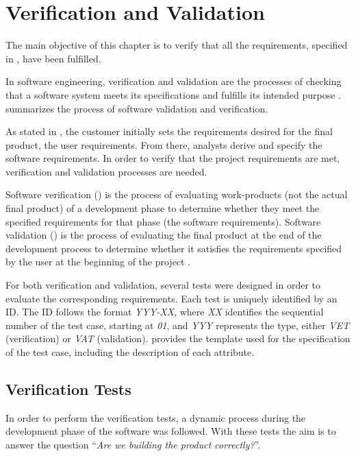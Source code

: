 \chapter{Verification and Validation}\label{chap:validation}
The main objective of this chapter is to verify that all the requirements, specified in , have been fulfilled.

In \gls{software engineering}, verification and validation are the processes of checking that a software system meets its specifications and fulfills its intended purpose \parencite{IEEE1012-2012}.  summarizes the process of software validation and verification.


As stated in , the customer initially sets the requirements desired for the final product, the user requirements. From there, analysts derive and specify the software requirements. In order to verify that the project requirements are met, verification and validation processes are needed.

Software verification () is the process of evaluating work-products (not the actual final product) of a development phase to determine whether they meet the specified requirements for that phase (the software requirements). Software validation () is the process of evaluating the final product at the end of the development process to determine whether it satisfies the requirements specified by the user at the beginning of the project \parencite{IEEE1012-2012}.

For both verification and validation, several tests were designed in order to evaluate the corresponding requirements. Each test is uniquely identified by an ID. The ID follows the format \textit{YYY-XX}, where \textit{XX} identifies the sequential number of the test case, starting at \textit{01}, and \textit{YYY} represents the type, either \textit{VET} (verification) or \textit{VAT} (validation).  provides the template used for the specification of the test case, including the description of each attribute.





\section{Verification Tests}\label{sec:verification}
In order to perform the verification tests, a dynamic process during the development phase of the software was followed. With these tests the aim is to answer the question ``\textit{Are we building the product correctly?}''.

